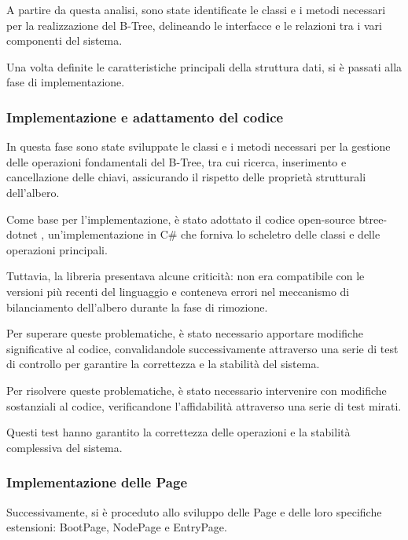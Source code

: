 \documentclass[12pt,a4paper,openright,twoside]{book}
\begin{document}
                A partire da questa analisi, sono state identificate le classi e i metodi necessari per la realizzazione del B-Tree, delineando le interfacce e le relazioni tra i vari componenti del sistema.

                Una volta definite le caratteristiche principali della struttura dati, si è passati alla fase di implementazione.

            \subsubsection{Implementazione e adattamento del codice}

                In questa fase sono state sviluppate le classi e i metodi necessari per la gestione delle operazioni fondamentali del B-Tree, tra cui ricerca, inserimento e cancellazione delle chiavi, assicurando il rispetto delle proprietà strutturali dell’albero.

                Come base per l’implementazione, è stato adottato il codice open-source btree-dotnet \cite{rsdcastro_btree_dotnet}, un’implementazione in C\# che forniva lo scheletro delle classi e delle operazioni principali.

                Tuttavia, la libreria presentava alcune criticità: non era compatibile con le versioni più recenti del linguaggio e conteneva errori nel meccanismo di bilanciamento dell’albero durante la fase di rimozione.

                Per superare queste problematiche, è stato necessario apportare modifiche significative al codice, convalidandole successivamente attraverso una serie di test di controllo per garantire la correttezza e la stabilità del sistema.

                Per risolvere queste problematiche, è stato necessario intervenire con modifiche sostanziali al codice, verificandone l’affidabilità attraverso una serie di test mirati.

                Questi test hanno garantito la correttezza delle operazioni e la stabilità complessiva del sistema.

            \subsubsection{Implementazione delle Page}

                Successivamente, si è proceduto allo sviluppo delle Page e delle loro specifiche estensioni: BootPage, NodePage e EntryPage.
\end{document}
